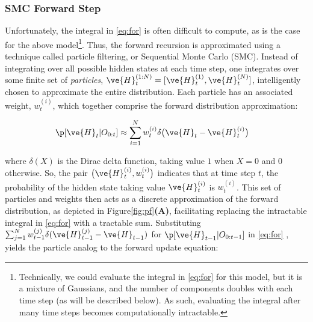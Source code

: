 \subsubsection{SMC Forward Step}

Unfortunately, the integral in \eqref{eq:for} is often difficult to compute, as is the case for the above model\footnote{Technically, we could evaluate the integral in \eqref{eq:for} for this model, but it is a mixture of Gaussians, and the number of components doubles with each time step (as will be described below).  As such, evaluating the integral after many time steps becomes computationally intractable.}.  Thus, the forward recursion is approximated using a technique called particle filtering, or Sequential Monte Carlo (SMC)\cite{DoucetAndrieu00, DoucetGordon01, KlaasDoucet05}.  Instead of integrating over all possible hidden states at each time step, one integrates over some finite set of \emph{particles}, $\ve{H}_t^{(1:N)}=[\ve{H}_t^{(1)}, \ve{H}_t^{(N)}]$, intelligently chosen to approximate the entire distribution.  Each particle has an associated weight, $w_t^{(i)}$, which together comprise the forward distribution approximation:

\begin{align} \label{eq:for_approx}
\p[\ve{H}_t | O_{0:t}] &\approx  \sum_{i=1}^N w_t^{(i)} \delta\big(\ve{H}_t - \ve{H}_t^{(i)}\big)
\end{align}

\noindent where $\delta(X)$ is the Dirac delta function, taking value $1$ when $X=0$ and $0$ otherwise.  So, the pair $\big(\ve{H}_t^{(i)},w_t^{(i)}\big)$ indicates that at time step $t$, the probability of the hidden state taking value $\ve{H}_t^{(i)}$ is $w_t^{(i)}$.  This set of particles and weights then acts as a discrete approximation of the forward distribution, as depicted in Figure\ref{fig:pf}\textbf{(A)}, facilitating replacing the intractable integral in \eqref{eq:for} with a tractable sum.  Substituting $\sum_{j=1}^N w_{t-1}^{(j)} \delta(\ve{H}_{t-1}^{(j)} - \ve{H}_{t-1})$ for $\p[\ve{H}_{t-1} | O_{0:t-1}]$ in \eqref{eq:for} , yields the particle analog to the forward update equation:

